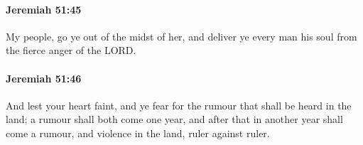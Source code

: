 		\paragraph{Jeremiah 51:45} %
			\label{JEREMIAH-51-45}

			My people, go ye out of the midst of her, and deliver ye every man his soul from the fierce anger of the LORD.


		\paragraph{Jeremiah 51:46} %
			\label{JEREMIAH-51-46}

			And lest your heart faint, and ye fear for the rumour that shall be heard in the land; a rumour shall both come one year, and after that in another year shall come a rumour, and violence in the land, ruler against ruler.


